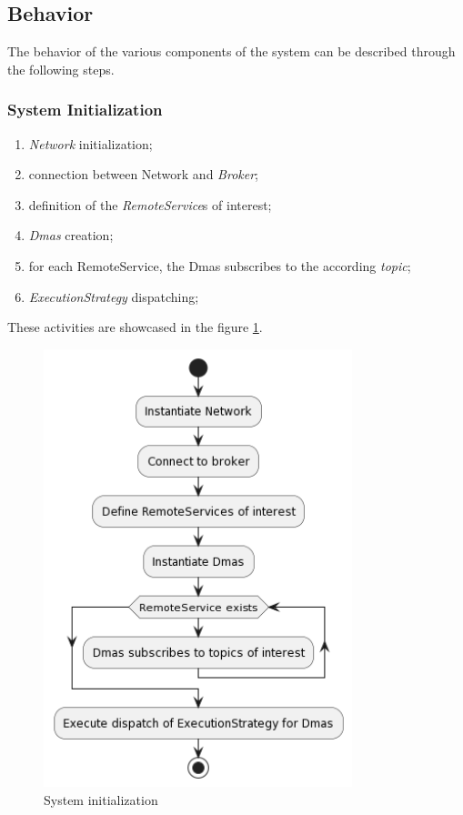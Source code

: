 \subsection{Behavior}
The behavior of the various components of the system can be described through the following steps.

\subsubsection{System Initialization}

\begin{enumerate}
    \item \textit{Network} initialization;
    \item connection between Network and \textit{Broker};
    \item definition of the \textit{RemoteService}s of interest;
    \item \textit{Dmas} creation;
    \item for each RemoteService, the Dmas subscribes to the according \textit{topic};
    \item \textit{ExecutionStrategy} dispatching;
\end{enumerate}

These activities are showcased in the figure \ref{fig:initialization}.

\begin{figure}[ht!]
    \centering
    \includegraphics[width=0.8\textwidth]{figures/activity-dmas.png}
    \caption{System initialization}
    \label{fig:initialization}
\end{figure}

